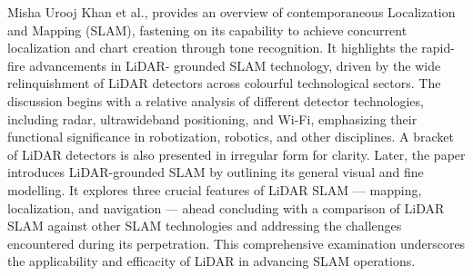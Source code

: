 {		Misha Urooj Khan et al., provides an overview of contemporaneous Localization and
		Mapping (SLAM), fastening on its capability to achieve concurrent localization and chart
		creation through tone recognition. It highlights the rapid-fire advancements in LiDAR-
		grounded SLAM technology, driven by the wide relinquishment of LiDAR detectors across
		colourful technological sectors. The discussion begins with a relative analysis of different
		detector technologies, including radar, ultrawideband positioning, and Wi-Fi, emphasizing
		their functional significance in robotization, robotics, and other disciplines. A bracket of
		LiDAR detectors is also presented in irregular form for clarity. Later, the paper introduces
		LiDAR-grounded SLAM by outlining its general visual and fine modelling. It explores three
		crucial features of LiDAR SLAM — mapping, localization, and navigation — ahead
		concluding with a comparison of LiDAR SLAM against other SLAM technologies and
		addressing the challenges encountered during its perpetration. This comprehensive
		examination underscores the applicability and efficacity of LiDAR in advancing SLAM
		operations. \cite{9526266}
		
	}	
